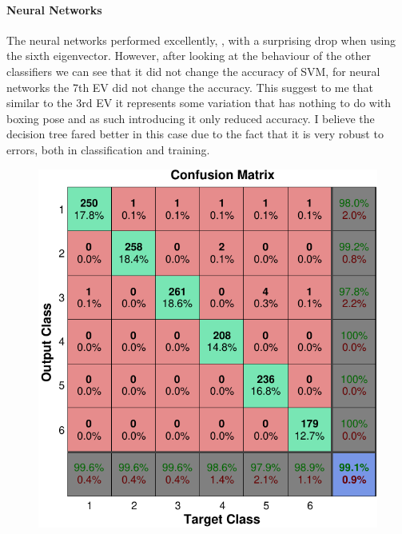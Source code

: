 \paragraph{Neural Networks}
The neural networks performed excellently, {}, with a surprising drop when using the sixth eigenvector. However, after looking at the behaviour of the other classifiers we can see that it did not change the accuracy of SVM, for neural networks the 7th EV did not change the accuracy. This suggest to me that similar to the 3rd EV it represents some variation that has nothing to do with boxing pose and as such introducing it only reduced accuracy. I believe the decision tree fared better in this case due to the fact that it is very robust to errors, both in classification and training.\clearpage

\begin{figure}[h]
    \centering
    \includegraphics[height=0.25\textheight]{fig05/CMtrain-crop.pdf}
    \label{fig:drcomp}
\end{figure}

